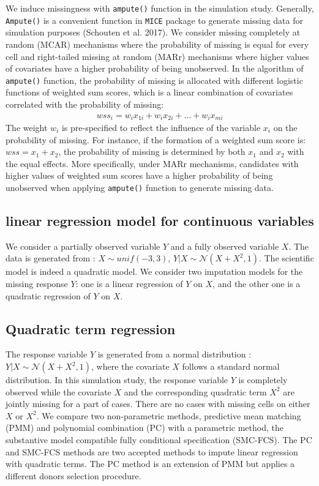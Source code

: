 \documentclass[12pt, fullpage, a4paper]{article}
\begin{document}
We induce missingness with \texttt{ampute()} function in the simulation study. Generally, \texttt{Ampute()} is a convenient function in \texttt{MICE} package to generate missing data for simulation purposes (Schouten et al. 2017)\nocite{Schouten2018}. We consider missing completely at random (MCAR) mechanisms where the probability of missing is equal for every cell and right-tailed missing at random (MARr) mechanisms where higher values of covariates have a higher probability of being unobserved. In the algorithm of \texttt{ampute()} function, the probability of missing is allocated with different logistic functions of weighted sum scores, which is a linear combination of covariates correlated with the probability of missing:
\begin{equation}
\begin{array}{ll}
wss_{i} = w_{i}x_{1i} + w_{i}x_{2i} + \dots + w_{i}x_{mi}
\end{array} 
\end{equation}
The weight $w_i$ is pre-specified to reflect the influence of the variable $x_{i}$ on the probability of missing. For instance, if the formation of a weighted sum score is:
$wss = x_1 + x_2$, the probability of missing is determined by both $x_1$ and $x_2$ with the equal effects. More specifically, under MARr mechanisms, candidates with higher values of weighted sum scores have a higher probability of being unobserved when applying \texttt{ampute()} function to generate missing data.

\subsection{linear regression model for continuous variables}
We consider a partially observed variable $Y$ and a fully observed variable $X$. The data is generated from : $X \sim unif(-3, 3)$, $Y|X \sim \mathcal{N}(X + X^2, 1)$. The scientific model is indeed a quadratic model. We consider two imputation models for the missing response $Y$: one is a linear regression of $Y$ on $X$, and the other one is a quadratic regression of $Y$ on $X$. 

\subsection{Quadratic term regression}
The response variable $Y$ is generated from a normal distribution : $Y|X \sim \mathcal{N}(X + X^2, 1)$, where the covariate $X$ follows a standard normal distribution. In this simulation study, the response variable $Y$ is completely observed while the covariate $X$ and the corresponding quadratic term $X^2$ are jointly missing for a part of cases. There are no cases with missing cells on either $X$ or $X^2$. We compare two non-parametric methods, predictive mean matching (PMM) and polynomial combination (PC) with a parametric method, the substantive model compatible fully conditional specification (SMC-FCS). The PC and SMC-FCS methods are two accepted methods to impute linear regression with quadratic terms. The PC method is an extension of PMM but applies a different donors selection procedure. 
\end{document}

